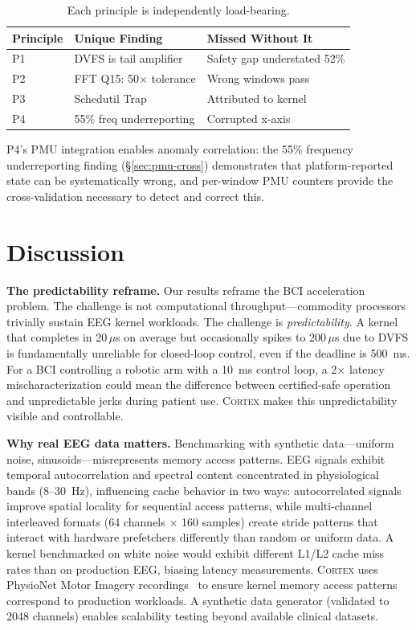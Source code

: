 \documentclass[sigplan,10pt]{acmart}
\newcommand{\cortex}{\textsc{Cortex}}
\begin{document}
\begin{table}[t]
\centering
\caption{Each principle is independently load-bearing.}
\label{tab:necessity}
\small
\begin{tabular}{@{}lll@{}}
\toprule
Principle & Unique Finding & Missed Without It \\
\midrule
P1 & DVFS is tail amplifier & Safety gap understated 52\% \\
P2 & FFT Q15: 50$\times$ tolerance & Wrong windows pass \\
P3 & Schedutil Trap & Attributed to kernel \\
P4 & 55\% freq underreporting & Corrupted x-axis \\
\bottomrule
\end{tabular}
\end{table}

P4's PMU integration enables anomaly correlation: the 55\% frequency underreporting finding (\S\ref{sec:pmu-cross}) demonstrates that platform-reported state can be systematically wrong, and per-window PMU counters provide the cross-validation necessary to detect and correct this.


\section{Discussion}
\label{sec:discussion}

\textbf{The predictability reframe.} Our results reframe the BCI acceleration problem. The challenge is not computational throughput---commodity processors trivially sustain EEG kernel workloads. The challenge is \emph{predictability}. A kernel that completes in 20\,$\mu$s on average but occasionally spikes to 200\,$\mu$s due to DVFS is fundamentally unreliable for closed-loop control, even if the deadline is 500~ms. For a BCI controlling a robotic arm with a 10~ms control loop, a 2$\times$ latency mischaracterization could mean the difference between certified-safe operation and unpredictable jerks during patient use. \cortex{} makes this unpredictability visible and controllable.

\textbf{Why real EEG data matters.} Benchmarking with synthetic data---uniform noise, sinusoids---misrepresents memory access patterns. EEG signals exhibit temporal autocorrelation and spectral content concentrated in physiological bands (8--30~Hz), influencing cache behavior in two ways: autocorrelated signals improve spatial locality for sequential access patterns, while multi-channel interleaved formats (64 channels $\times$ 160 samples) create stride patterns that interact with hardware prefetchers differently than random or uniform data. A kernel benchmarked on white noise would exhibit different L1/L2 cache miss rates than on production EEG, biasing latency measurements. \cortex{} uses PhysioNet Motor Imagery recordings~\cite{goldberger2000physionet} to ensure kernel memory access patterns correspond to production workloads. A synthetic data generator (validated to 2048 channels) enables scalability testing beyond available clinical datasets.
\end{document}

